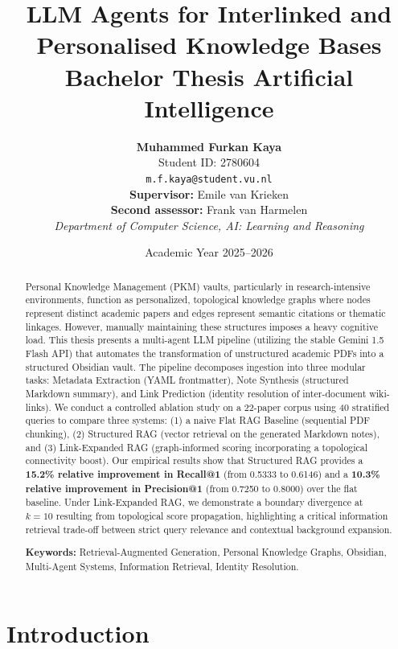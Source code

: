 \documentclass[11pt, a4paper, oneside]{article}
\title{
    \vspace{-2cm}
    \textbf{\huge LLM Agents for Interlinked and \\ Personalised Knowledge Bases} \\
    \vspace{0.5cm}
    \large Bachelor Thesis Artificial Intelligence
}
\author{
    \textbf{Muhammed Furkan Kaya} \\
    \small Student ID: 2780604 \\
    \small \texttt{m.f.kaya@student.vu.nl} \\[1.5em]
    \small \textbf{Supervisor:} Emile van Krieken \\
    \small \textbf{Second assessor:} Frank van Harmelen \\
    \small \textit{Department of Computer Science, AI: Learning and Reasoning}
}
\date{Academic Year 2025--2026}
\begin{document}
\maketitle
\thispagestyle{empty}
\newpage

\tableofcontents
\newpage

\begin{abstract}
Personal Knowledge Management (PKM) vaults, particularly in research-intensive environments, function as personalized, topological knowledge graphs where nodes represent distinct academic papers and edges represent semantic citations or thematic linkages. However, manually maintaining these structures imposes a heavy cognitive load. This thesis presents a multi-agent LLM pipeline (utilizing the stable Gemini 1.5 Flash API) that automates the transformation of unstructured academic PDFs into a structured Obsidian vault. The pipeline decomposes ingestion into three modular tasks: Metadata Extraction (YAML frontmatter), Note Synthesis (structured Markdown summary), and Link Prediction (identity resolution of inter-document wiki-links). We conduct a controlled ablation study on a 22-paper corpus using 40 stratified queries to compare three systems: (1) a naive Flat RAG Baseline (sequential PDF chunking), (2) Structured RAG (vector retrieval on the generated Markdown notes), and (3) Link-Expanded RAG (graph-informed scoring incorporating a topological connectivity boost). Our empirical results show that Structured RAG provides a \textbf{15.2\% relative improvement in Recall@1} (from 0.5333 to 0.6146) and a \textbf{10.3\% relative improvement in Precision@1} (from 0.7250 to 0.8000) over the flat baseline. Under Link-Expanded RAG, we demonstrate a boundary divergence at $k=10$ resulting from topological score propagation, highlighting a critical information retrieval trade-off between strict query relevance and contextual background expansion. 

\vspace{0.5cm}
\noindent \textbf{Keywords:} Retrieval-Augmented Generation, Personal Knowledge Graphs, Obsidian, Multi-Agent Systems, Information Retrieval, Identity Resolution.
\end{abstract}
\newpage

\section{Introduction}
\label{sec:intro}
\end{document}
